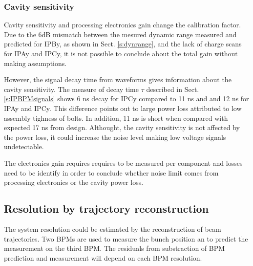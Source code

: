 \subsubsection{Cavity sensitivity}\label{s:resosensi}
Cavity sensitivity and processing electronics gain change the calibration factor. Due to the 6dB mismatch between the mesured dynamic range measured and predicted for IPBy, as shown in Sect. \ref{s:dynrange}, and the lack of charge scans for IPAy and IPCy, it is not possible to conclude about the total gain without making assumptions.\par
However, the signal decay time from waveforms gives information about the cavity sensitivity. The measure of decay time $\tau$ described in Sect. \ref{s:IPBPMsignals} shows 6 ns decay for IPCy compared to 11 ns and and 12 ns for IPAy and IPCy. This difference points out to large power loss attributed to low assembly tighness of bolts. In addition, 11 ns is short when compared with expected 17 ns from design. Althought, the cavity sensitivity is not affected by the power loss, it could increase the noise level making low voltage signals undetectable.\par
The electronics gain requires requires to be measured per component and losses need to be identify in order to conclude whether noise limit comes from processing electronics or the cavity power loss.

\subsection{Resolution by trajectory reconstruction}
The system resolution could be estimated by the reconstruction of beam trajectories. Two BPMs are used to measure the bunch position an to predict the measurement on the third BPM. The residuals from substraction of BPM prediction and measurement will depend on each BPM resolution.\par

